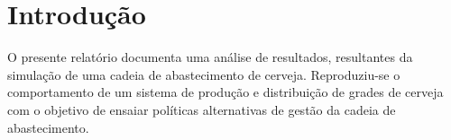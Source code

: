 \chapter{Introdução}
\label{cap:intro}

O presente relatório documenta uma análise de resultados, resultantes da simulação de  uma cadeia de abastecimento de cerveja. Reproduziu-se o comportamento de um sistema de produção e distribuição de grades de cerveja com o objetivo de ensaiar políticas alternativas de gestão da cadeia de abastecimento. 
